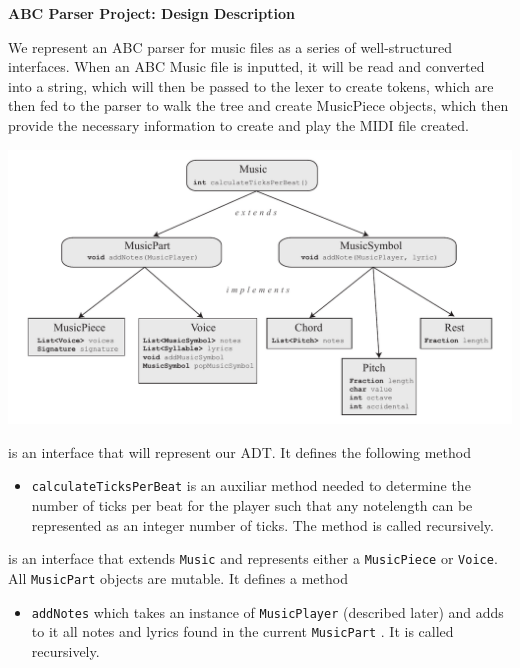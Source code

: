 \documentclass[12pt]{book}
\begin{document}
\phantom{xxx}
\bigskip
\centerline{{\large \bf ABC Parser Project: Design Description }}
\bigskip\bigskip


We represent an ABC parser for music files as a series of well-structured interfaces. When an ABC Music file is inputted, it will be read and converted into a string, which will then be passed to the lexer to create tokens, which are then fed to the parser to walk the tree and create MusicPiece objects, which then provide the necessary information to create and play the MIDI file created.

\centerline{ \includegraphics{Music.pdf}}

 is an interface that will represent our ADT. It defines the following method

\begin{itemize} 

\item { \tt calculateTicksPerBeat} is an auxiliar method needed to determine the number of ticks per beat for the player such that any notelength can be represented as an integer number of ticks. The method is called recursively.
\end{itemize}

\medskip 

 is an interface that extends {\tt Music} and represents either a {\tt MusicPiece} or {\tt Voice}.  All {\tt MusicPart} objects are mutable. It defines a method
\begin{itemize} 
\item { \tt addNotes} which takes an instance of  {\tt MusicPlayer} (described later) and adds to it all notes and lyrics found in the current {\tt MusicPart}  . It is called recursively.
\end{itemize}
\end{document}
